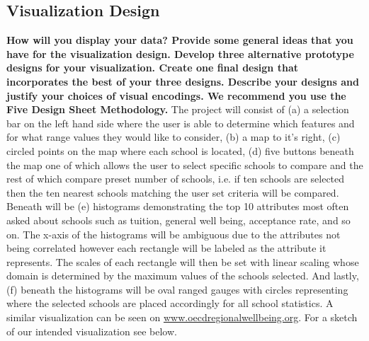 \documentclass[11pt, a4paper]{article}
\begin{document}
  \subsection{Visualization Design}
  \textbf{ How will you display your data? Provide some general ideas that you have for the visualization design. Develop three alternative prototype designs for your visualization. Create one final design that incorporates the best of your three designs. Describe your designs and justify your choices of visual encodings. We recommend you use the Five Design Sheet Methodology.}
  The project will consist of (a) a selection bar on the left hand side where the user is able to determine which features and for what range values they would like to consider, (b) a map to it's right, (c) circled points on the map where each school is located, (d) five buttons beneath the map one of which allows the user to select specific schools to compare and the rest of which compare preset number of schools, i.e. if ten schools are selected then the ten nearest schools matching the user set criteria will be compared. Beneath will be (e) histograms demonstrating the top 10 attributes most often asked about schools such as tuition, general well being, acceptance rate, and so on. The x-axis of the histograms will be ambiguous due to the attributes not being correlated however each rectangle will be labeled as the attribute it represents. The scales of each rectangle will then be set with linear scaling whose domain is determined by the maximum values of the schools selected. And lastly, (f) beneath the histograms will be oval ranged gauges with circles representing where the selected schools are placed accordingly for all school statistics. A similar visualization can be seen on \href{https://www.oecdregionalwellbeing.org}{www.oecdregionalwellbeing.org}. For a sketch of our intended visualization see below.  
\end{document}
